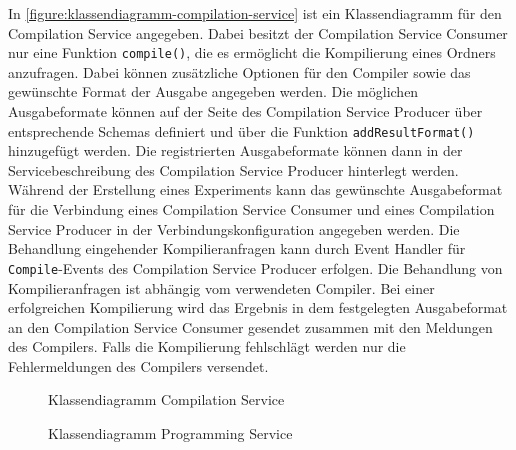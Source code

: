 In \autoref{figure:klassendiagramm-compilation-service} ist ein Klassendiagramm für den Compilation Service angegeben. Dabei besitzt der Compilation Service Consumer nur eine Funktion \texttt{compile()}, die es ermöglicht die Kompilierung eines Ordners anzufragen. Dabei können zusätzliche Optionen für den Compiler sowie das gewünschte Format der Ausgabe angegeben werden. Die möglichen Ausgabeformate können auf der Seite des Compilation Service Producer über entsprechende Schemas definiert und über die Funktion \texttt{addResultFormat()} hinzugefügt werden. Die registrierten Ausgabeformate können dann in der Servicebeschreibung des Compilation Service Producer hinterlegt werden. Während der Erstellung eines Experiments kann das gewünschte Ausgabeformat für die Verbindung eines Compilation Service Consumer und eines Compilation Service Producer in der Verbindungskonfiguration angegeben werden. Die Behandlung eingehender Kompilieranfragen kann durch Event Handler für \texttt{Compile}-Events des Compilation Service Producer erfolgen. Die Behandlung von Kompilieranfragen ist abhängig vom verwendeten Compiler. Bei einer erfolgreichen Kompilierung wird das Ergebnis in dem festgelegten Ausgabeformat an den Compilation Service Consumer gesendet zusammen mit den Meldungen des Compilers. Falls die Kompilierung fehlschlägt werden nur die Fehlermeldungen des Compilers versendet.

\begin{figure}[tbp]
    \centering
    \caption{Klassendiagramm Compilation Service}
    \label{figure:klassendiagramm-compilation-service}
\end{figure}

\begin{figure}[tbp]
    \centering
    \caption{Klassendiagramm Programming Service}
    \label{figure:klassendiagramm-programming-service}
\end{figure}

